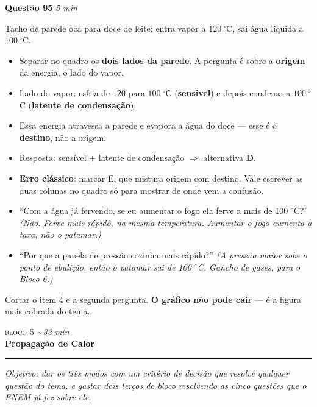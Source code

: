 \documentclass[11pt,a4paper]{article}
\newcommand{\bloco}[3]{%
  \needspace{7\baselineskip}
  \vspace{1.8em}
  {\scshape\color{vinho}bloco #1}\hfill
    {\small\itshape\color{grafite}\textasciitilde\,#3 min}\\[0.1em]
  {\Large\bfseries #2}\\[-0.55em]
  {\color{black!30}\rule{\linewidth}{0.5pt}}
  \par\nobreak\smallskip
}
\newcommand{\objetivo}[1]{{\itshape\color{grafite}Objetivo: #1}\par\smallskip}
\newcommand{\questao}[3]{%
  \needspace{4\baselineskip}\medskip
  {\bfseries\color{vinho}#1}\quad{\small\itshape\color{grafite}#2}%
  \hfill{\small\itshape\color{grafite}#3}\par\smallskip}
\begin{document}
\begin{projetor}
\questao{Quest\~ao 95}{ENEM 2023, caderno amarelo}{5 min}
Tacho de parede oca para doce de leite: entra vapor a $120\ ^\circ$C,
sai \'agua l\'iquida a $100\ ^\circ$C.
\begin{itemize}[nosep]
  \item Separar no quadro os \textbf{dois lados da parede}. A pergunta \'e
        sobre a \textbf{origem} da energia, o lado do vapor.
  \item Lado do vapor: esfria de $120$ para $100\ ^\circ$C
        (\textbf{sens\'ivel}) e depois condensa a $100\ ^\circ$C
        (\textbf{latente de condensa\c{c}\~ao}).
  \item Essa energia atravessa a parede e evapora a \'agua do doce ---
        esse \'e o \textbf{destino}, n\~ao a origem.
  \item Resposta: sens\'ivel + latente de condensa\c{c}\~ao $\Rightarrow$
        alternativa \textbf{D}.
  \item \textbf{Erro cl\'assico}: marcar E, que mistura origem com
        destino. Vale escrever as duas colunas no quadro s\'o para mostrar
        de onde vem a confus\~ao.
\end{itemize}
\end{projetor}

\begin{perguntas}
\begin{itemize}[nosep]
  \item ``Com a \'agua j\'a fervendo, se eu aumentar o fogo ela ferve a mais
        de 100 $^\circ$C?'' \textit{(N\~ao. Ferve mais r\'apido, na mesma
        temperatura. Aumentar o fogo aumenta a taxa, n\~ao o patamar.)}
  \item ``Por que a panela de press\~ao cozinha mais r\'apido?''
        \textit{(A press\~ao maior sobe o ponto de ebuli\c{c}\~ao, ent\~ao o
        patamar sai de 100 $^\circ$C. Gancho de gases, para o Bloco 6.)}
\end{itemize}
\end{perguntas}

\begin{corte}
Cortar o item 4 e a segunda pergunta. \textbf{O gr\'afico n\~ao pode cair} ---
\'e a figura mais cobrada do tema.
\end{corte}

\bloco{5}{Propaga\c{c}\~ao de Calor}{33}

\objetivo{dar os tr\^es modos com um crit\'erio de decis\~ao que resolve
qualquer quest\~ao do tema, e gastar dois ter\c{c}os do bloco resolvendo as
cinco quest\~oes que o ENEM j\'a fez sobre ele.}
\end{document}
